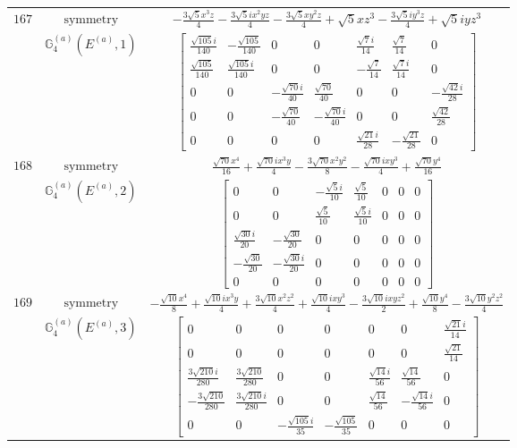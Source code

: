 \documentclass[fleqn,8pt,landscape]{jsarticle}
\begin{document}
\begin{longtable}{ccc}
$ 167 $ & $ \text{symmetry} $ & $ - \frac{3 \sqrt{5} x^{3} z}{4} - \frac{3 \sqrt{5} i x^{2} y z}{4} - \frac{3 \sqrt{5} x y^{2} z}{4} + \sqrt{5} x z^{3} - \frac{3 \sqrt{5} i y^{3} z}{4} + \sqrt{5} i y z^{3} $ \\
$  $ & $ \mathbb{G}_{4}^{(a)}(E^{(a)},1) $ & $ \begin{bmatrix} \frac{\sqrt{105} i}{140} & - \frac{\sqrt{105}}{140} & 0 & 0 & \frac{\sqrt{7} i}{14} & \frac{\sqrt{7}}{14} & 0 \\ \frac{\sqrt{105}}{140} & \frac{\sqrt{105} i}{140} & 0 & 0 & - \frac{\sqrt{7}}{14} & \frac{\sqrt{7} i}{14} & 0 \\ 0 & 0 & - \frac{\sqrt{70} i}{40} & \frac{\sqrt{70}}{40} & 0 & 0 & - \frac{\sqrt{42} i}{28} \\ 0 & 0 & - \frac{\sqrt{70}}{40} & - \frac{\sqrt{70} i}{40} & 0 & 0 & \frac{\sqrt{42}}{28} \\ 0 & 0 & 0 & 0 & \frac{\sqrt{21} i}{28} & - \frac{\sqrt{21}}{28} & 0 \end{bmatrix} $ \\ \hline
$ 168 $ & $ \text{symmetry} $ & $ \frac{\sqrt{70} x^{4}}{16} + \frac{\sqrt{70} i x^{3} y}{4} - \frac{3 \sqrt{70} x^{2} y^{2}}{8} - \frac{\sqrt{70} i x y^{3}}{4} + \frac{\sqrt{70} y^{4}}{16} $ \\
$  $ & $ \mathbb{G}_{4}^{(a)}(E^{(a)},2) $ & $ \begin{bmatrix} 0 & 0 & - \frac{\sqrt{5} i}{10} & \frac{\sqrt{5}}{10} & 0 & 0 & 0 \\ 0 & 0 & \frac{\sqrt{5}}{10} & \frac{\sqrt{5} i}{10} & 0 & 0 & 0 \\ \frac{\sqrt{30} i}{20} & - \frac{\sqrt{30}}{20} & 0 & 0 & 0 & 0 & 0 \\ - \frac{\sqrt{30}}{20} & - \frac{\sqrt{30} i}{20} & 0 & 0 & 0 & 0 & 0 \\ 0 & 0 & 0 & 0 & 0 & 0 & 0 \end{bmatrix} $ \\ \hline
$ 169 $ & $ \text{symmetry} $ & $ - \frac{\sqrt{10} x^{4}}{8} + \frac{\sqrt{10} i x^{3} y}{4} + \frac{3 \sqrt{10} x^{2} z^{2}}{4} + \frac{\sqrt{10} i x y^{3}}{4} - \frac{3 \sqrt{10} i x y z^{2}}{2} + \frac{\sqrt{10} y^{4}}{8} - \frac{3 \sqrt{10} y^{2} z^{2}}{4} $ \\
$  $ & $ \mathbb{G}_{4}^{(a)}(E^{(a)},3) $ & $ \begin{bmatrix} 0 & 0 & 0 & 0 & 0 & 0 & \frac{\sqrt{21} i}{14} \\ 0 & 0 & 0 & 0 & 0 & 0 & \frac{\sqrt{21}}{14} \\ \frac{3 \sqrt{210} i}{280} & \frac{3 \sqrt{210}}{280} & 0 & 0 & \frac{\sqrt{14} i}{56} & \frac{\sqrt{14}}{56} & 0 \\ - \frac{3 \sqrt{210}}{280} & \frac{3 \sqrt{210} i}{280} & 0 & 0 & \frac{\sqrt{14}}{56} & - \frac{\sqrt{14} i}{56} & 0 \\ 0 & 0 & - \frac{\sqrt{105} i}{35} & - \frac{\sqrt{105}}{35} & 0 & 0 & 0 \end{bmatrix} $ \\ \hline

\end{longtable}
\end{document}
